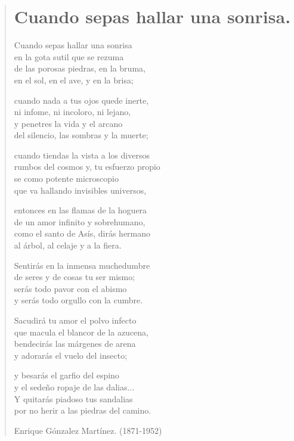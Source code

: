 \documentclass[12pt, twoside]{book}
\begin{document}
\begin{verse}
\begin{center}
\section{Cuando sepas hallar una sonrisa.}
\end{center}

Cuando sepas hallar una sonrisa\\
en la gota sutil que se rezuma\\
de las porosas piedras, en la bruma,\\
en el sol, en el ave, y en la brisa;
\newline

cuando nada a tus ojos quede inerte,\\
ni infome, ni incoloro, ni lejano,\\
y penetres la vida y el arcano\\
del silencio, las sombras y la muerte;
\newline

cuando tiendas la vista a los diversos\\
rumbos del cosmos y, tu esfuerzo propio\\
se como potente microscopio\\
que va hallando invisibles universos,
\newline

entonces en las flamas de la hoguera\\
de un amor infinito y sobrehumano,\\
como el santo de Asís, dirás hermano\\
al árbol, al celaje y a la fiera.
\newline

Sentirás en la inmensa muchedumbre\\
de seres y de cosas tu ser mismo;\\
serás todo pavor con el abismo\\
y serás todo orgullo con la cumbre.
\newline

Sacudirá tu amor el polvo infecto\\
que macula el blancor de la azucena,\\
bendecirás las márgenes de arena\\
y adorarás el vuelo del insecto;
\newpage

y besarás el garfio del espino\\
y el sedeño ropaje de las dalias...\\
Y quitarás piadoso tus sandalias\\
por no herir a las piedras del camino.
\newline

Enrique Gónzalez Martínez. (1871-1952)

\end{verse}
\newpage
\end{document}
